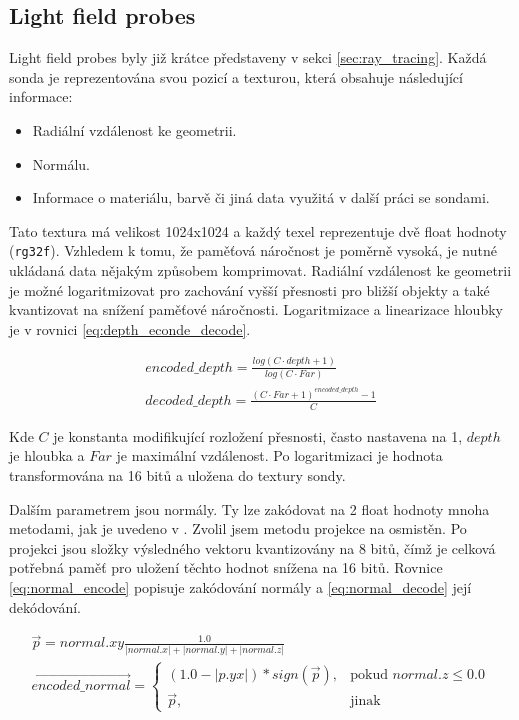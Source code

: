 \subsection{Light field probes}\label{sec:lfp_design}
Light field probes byly již krátce představeny v sekci \ref{sec:ray_tracing}. Každá sonda je reprezentována svou pozicí a texturou, která obsahuje následující informace:
\begin{itemize}
 \item Radiální vzdálenost ke geometrii.
 \item Normálu.
 \item Informace o materiálu, barvě či jiná data využitá v další práci se sondami.
\end{itemize}

Tato textura má velikost 1024x1024 a každý texel reprezentuje dvě float hodnoty (\texttt{rg32f}). Vzhledem k tomu, že paměťová náročnost je poměrně vysoká, je nutné ukládaná data nějakým způsobem komprimovat. Radiální vzdálenost ke geometrii je možné logaritmizovat pro zachování vyšší přesnosti pro bližší objekty a také kvantizovat na snížení paměťové náročnosti. Logaritmizace a linearizace hloubky je v rovnici \ref{eq:depth_econde_decode}.

\begin{equation} \label{eq:depth_econde_decode}
	\begin{gathered}
		encoded\_depth = \frac{log(C \cdot depth + 1)}{log(C \cdot Far)}\\
		decoded\_depth = \frac{(C \cdot Far + 1)^{encoded\_depth} - 1}{C}
	\end{gathered}
\end{equation}

Kde $C$ je konstanta modifikující rozložení přesnosti, často nastavena na 1, $depth$ je hloubka a $Far$ je maximální vzdálenost. Po logaritmizaci je hodnota transformována na 16 bitů a uložena do textury sondy.

Dalším parametrem jsou normály. Ty lze zakódovat na 2 float hodnoty mnoha metodami, jak je uvedeno v \cite{Cigolle2014ASO}. Zvolil jsem metodu projekce na osmistěn. Po projekci jsou složky výsledného vektoru kvantizovány na 8 bitů, čímž je celková potřebná paměť pro uložení těchto hodnot snížena na 16 bitů. Rovnice \ref{eq:normal_encode} popisuje zakódování normály a \ref{eq:normal_decode} její dekódování.

\begin{equation} \label{eq:normal_encode}
	\begin{gathered}
		\vec{p} = normal.xy \frac{1.0}{|normal.x| + |normal.y| + |normal.z|} \\
		\vec{encoded\_normal} = \begin{cases}
            (1.0 - |p.yx|) * sign(\vec{p}),& \text{pokud } normal.z \leq 0.0\\
            \vec{p},              & \text{jinak}
        \end{cases}\\
	\end{gathered}
\end{equation}

